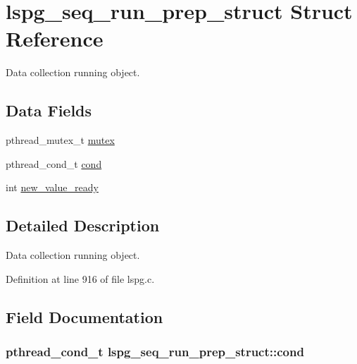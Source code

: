 \hypertarget{structlspg__seq__run__prep__struct}{\section{lspg\-\_\-seq\-\_\-run\-\_\-prep\-\_\-struct Struct Reference}
\label{structlspg__seq__run__prep__struct}
}


Data collection running object.  


\subsection*{Data Fields}
\begin{DoxyCompactItemize}
\item 
pthread\-\_\-mutex\-\_\-t \hyperlink{structlspg__seq__run__prep__struct_ad146cb91b5f7dd8bb283092c28781fe7}{mutex}
\item 
pthread\-\_\-cond\-\_\-t \hyperlink{structlspg__seq__run__prep__struct_acd83ea6994f57377716ff01c8ee7ce43}{cond}
\item 
int \hyperlink{structlspg__seq__run__prep__struct_a42d08888327e9059ddd69ddfec31b8a9}{new\-\_\-value\-\_\-ready}
\end{DoxyCompactItemize}


\subsection{Detailed Description}
Data collection running object. 

Definition at line 916 of file lspg.\-c.



\subsection{Field Documentation}
\hypertarget{structlspg__seq__run__prep__struct_acd83ea6994f57377716ff01c8ee7ce43}{
\subsubsection[{cond}]{\setlength{\rightskip}{0pt plus 5cm}pthread\-\_\-cond\-\_\-t lspg\-\_\-seq\-\_\-run\-\_\-prep\-\_\-struct\-::cond}}\label{structlspg__seq__run__prep__struct_acd83ea6994f57377716ff01c8ee7ce43}


